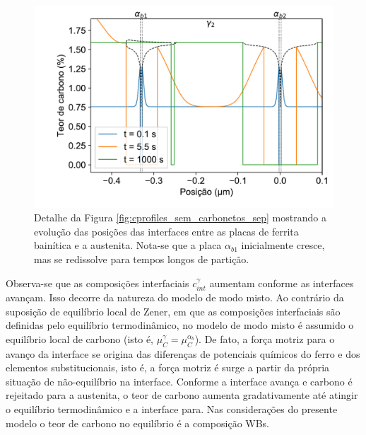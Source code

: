 \begin{figure}
  \includegraphics[width=.8\textwidth]{img/cpartition/cprofiles/coupled_FoFo_375_CCE_tracking.pdf}
  \caption{Detalhe da Figura \ref{fig:cprofiles_sem_carbonetos_sep} mostrando a evolução das posições das interfaces entre as placas de ferrita bainítica e a austenita. Nota-se que a placa $\alpha_{b1}$ inicialmente cresce, mas se redissolve para tempos longos de partição.}
  \label{fig:cprofiles_sem_carbonetos_tracking}
\end{figure}

Observa-se que as composições interfaciais $c^\gamma_{int}$ aumentam conforme as interfaces avançam. Isso decorre da natureza do modelo de modo misto. Ao contrário da suposição de equilíbrio local de Zener, em que as composições interfaciais são definidas pelo equilíbrio termodinâmico, no modelo de modo misto é assumido o equilíbrio local de carbono (isto é, $\mu_C^\gamma = \mu_C^{\alpha_b}$). De fato, a força motriz para o avanço da interface se origina das diferenças de potenciais químicos do ferro e dos elementos substitucionais, isto é, a força motriz é surge a partir da própria situação de não-equilíbrio na interface. Conforme a interface avança e carbono é rejeitado para a austenita, o teor de carbono aumenta gradativamente até atingir o equilíbrio termodinâmico e a interface para. Nas considerações do presente modelo o teor de carbono no equilíbrio é a composição WBs.

